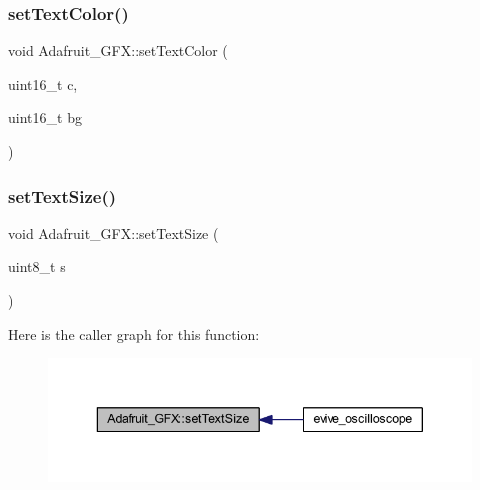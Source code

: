 \subsubsection{\texorpdfstring{set\+Text\+Color()}{setTextColor()}\hspace{0.1cm}{\footnotesize\ttfamily [2/2]}}
{\footnotesize\ttfamily void Adafruit\+\_\+\+G\+F\+X\+::set\+Text\+Color (\begin{DoxyParamCaption}\item[{uint16\+\_\+t}]{c,  }\item[{uint16\+\_\+t}]{bg }\end{DoxyParamCaption})}

\mbox{\label{class_adafruit___g_f_x_a39eb4a8a2c9fa4ab7d58ceffd19535d5}} 
\subsubsection{\texorpdfstring{set\+Text\+Size()}{setTextSize()}}
{\footnotesize\ttfamily void Adafruit\+\_\+\+G\+F\+X\+::set\+Text\+Size (\begin{DoxyParamCaption}\item[{uint8\+\_\+t}]{s }\end{DoxyParamCaption})}

Here is the caller graph for this function\+:\nopagebreak
\begin{figure}[H]
\begin{center}
\leavevmode
\includegraphics[width=343pt]{class_adafruit___g_f_x_a39eb4a8a2c9fa4ab7d58ceffd19535d5_icgraph}
\end{center}
\end{figure}
\mbox{\label{class_adafruit___g_f_x_aeeacd62bf26f3e7abbdc4b5b50faa6fa}} 
